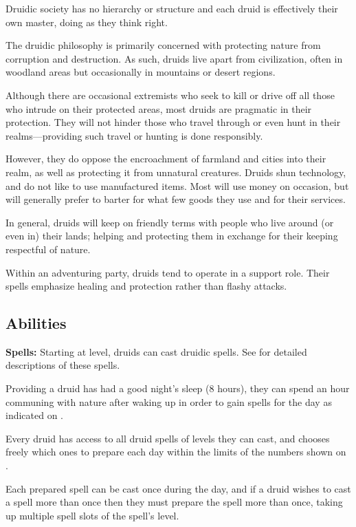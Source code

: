 \begin{multicols*}{2}
Druidic society has no hierarchy or structure and each druid is effectively their own master, doing as they think right.

The druidic philosophy is primarily concerned with protecting nature from corruption and destruction. As such, druids live apart from civilization, often in woodland areas but occasionally in mountains or desert regions.

Although there are occasional extremists who seek to kill or drive off all those who intrude on their protected areas, most druids are pragmatic in their protection. They will not hinder those who travel through or even hunt in their realms—providing such travel or hunting is done responsibly.

However, they do oppose the encroachment of farmland and cities into their realm, as well as protecting it from unnatural creatures. Druids shun technology, and do not like to use manufactured items. Most will use money on occasion, but will generally prefer to barter for what few goods they use and for their services.

In general, druids will keep on friendly terms with people who live around (or even in) their lands; helping and protecting them in exchange for their keeping respectful of nature.

Within an adventuring party, druids tend to operate in a support role. Their spells emphasize healing and protection rather than flashy attacks.

\subsection{Abilities}
\textbf{Spells:} Starting at  level, druids can cast druidic spells. See  for detailed descriptions of these spells.

Providing a druid has had a good night’s sleep (8 hours), they can spend an hour communing with nature after waking up in order to gain spells for the day as indicated on .

Every druid has access to all druid spells of levels they can cast, and chooses freely which ones to prepare each day within the limits of the numbers shown on .

Each prepared spell can be cast once during the day, and if a druid wishes to cast a spell more than once then they must prepare the spell more than once, taking up multiple spell slots of the spell’s level.


\end{multicols*}
